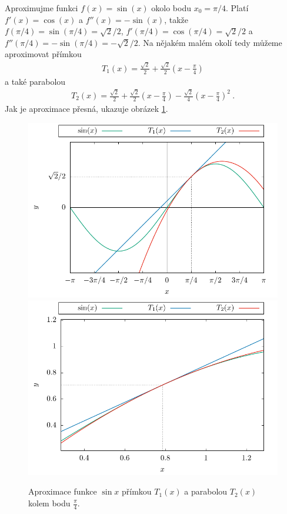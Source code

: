 \begin{example}
    Aproximujme funkci $f(x) = \sin(x)$ okolo bodu $x_0 = \pi/4$. Platí $f'(x) = \cos (x)$ a $f''(x) = - \sin (x)$, takže $f(\pi/4) = \sin (\pi/4) = \sqrt{2}/2$, $f'(\pi/4) = \cos (\pi/4) = \sqrt{2}/2$ a $f''(\pi/4) = - \sin (\pi/4) = -\sqrt{2}/2$.
    Na nějakém malém okolí tedy můžeme aproximovat přímkou \begin{align}
        T_1(x) = \frac{\sqrt{2}}{2} + \frac{\sqrt{2}}{2} \left(x - \frac{\pi}{4} \right)
    \end{align} 
    a také parabolou
    \begin{align}
        T_2(x) = \frac{\sqrt{2}}{2} + \frac{\sqrt{2}}{2} \left( x - \frac{\pi}{4} \right) 
        - \frac{\sqrt{2}}{4} \left( x - \frac{\pi}{4} \right)^2  \:.
    \end{align}
    Jak je aproximace přesná, ukazuje obrázek \ref{fig:aproximace}.
    \begin{figure}[H]
        \centering

        \includegraphics[scale = 0.7]{Gnuplot/Figures/aproximace-sinus.pdf}
        \includegraphics[scale = 0.7]{Gnuplot/Figures/aproximace-sinus2.pdf}
        
        \caption{Aproximace funkce $\sin x$ přímkou $T_1(x)$ a parabolou $T_2(x)$ kolem bodu $\frac{\pi}{4}$.}
        \label{fig:aproximace}
    \end{figure}

\end{example}

